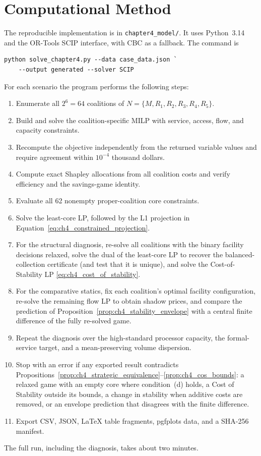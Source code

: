\section{Computational Method}

The reproducible implementation is in \texttt{chapter4\_model/}. It uses
Python~3.14 and the OR-Tools SCIP interface, with CBC as a fallback. The command
is
\begin{verbatim}
python solve_chapter4.py --data case_data.json `
    --output generated --solver SCIP
\end{verbatim}

For each scenario the program performs the following steps:
\begin{enumerate}
\item Enumerate all $2^6=64$ coalitions of
$N=\{M,R_1,R_2,R_3,R_4,R_5\}$.
\item Build and solve the coalition-specific MILP with service, access, flow,
and capacity constraints.
\item Recompute the objective independently from the returned variable values
and require agreement within $10^{-4}$ thousand dollars.
\item Compute exact Shapley allocations from all coalition costs and verify
efficiency and the savings-game identity.
\item Evaluate all 62 nonempty proper-coalition core constraints.
\item Solve the least-core LP, followed by the L1 projection in
Equation~\eqref{eq:ch4_constrained_projection}.
\item For the structural diagnosis, re-solve all coalitions with the binary
facility decisions relaxed, solve the dual of the least-core LP to recover the
balanced-collection certificate (and test that it is unique), and solve the
Cost-of-Stability LP \eqref{eq:ch4_cost_of_stability}.
\item For the comparative statics, fix each coalition's optimal facility
configuration, re-solve the remaining flow LP to obtain shadow prices, and
compare the prediction of Proposition~\ref{prop:ch4_stability_envelope} with a
central finite difference of the fully re-solved game.
\item Repeat the diagnosis over the high-standard processor capacity, the
formal-service target, and a mean-preserving volume dispersion.
\item Stop with an error if any exported result contradicts
Propositions~\ref{prop:ch4_strategic_equivalence}--\ref{prop:ch4_cos_bounds}:
a relaxed game with an empty core where condition~(d) holds, a Cost of
Stability outside its bounds, a change in stability when additive costs are
removed, or an envelope prediction that disagrees with the finite difference.
\item Export CSV, JSON, LaTeX table fragments, pgfplots data, and a SHA-256
manifest.
\end{enumerate}
The full run, including the diagnosis, takes about two minutes.

